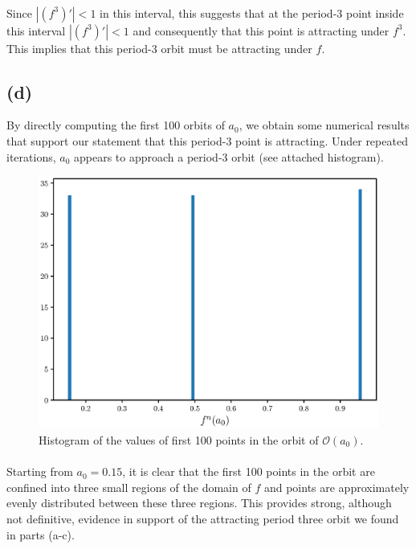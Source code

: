 \documentclass{article}
\begin{document}
\paragraph{}
Since $|(f^3)'| < 1$ in this interval, this suggests that at the period-3 point inside this 
interval $|(f^3)'| < 1$ and consequently that this point is attracting under $f^3$. This implies 
that this period-3 orbit must be attracting under $f$.

\subsection*{(d)}
By directly computing the first 100 orbits of $a_0$, we obtain some numerical results that support our 
statement that this period-3 point is attracting. Under repeated iterations, $a_0$ appears to 
approach a period-3 orbit (see attached histogram).

\begin{figure}[H]
    \centering
    \includegraphics[scale = 0.6]{Figure_3.eps}
	\caption{Histogram of the values of first 100 points in the orbit of $\mathcal{O}(a_0)$.}
    \label{fig:f_histogram}
\end{figure}

\paragraph{}
Starting from $a_0 = 0.15$, it is clear that the first 100 points in the orbit are confined into 
three small regions of the domain of $f$ and points are approximately evenly distributed between these 
three regions. This provides strong, although not definitive, evidence in support of the attracting 
period three orbit we found in parts (a-c).
\end{document}
